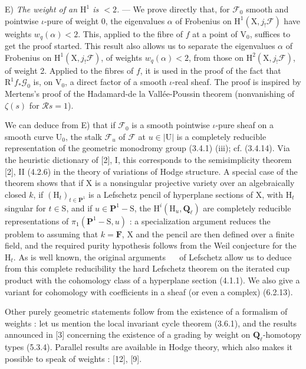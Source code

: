 \documentclass[11pt,leqno]{article}
\newcommand{\Page}[1]{\ifvmode\noindent\else\unskip\ \fi{\footnotesize\textcolor{gray}{[p.\,#1]}}\ \ignorespaces}
\begin{document}
E) \textit{The weight of an \(\mathrm{H}^1\) is \(<2\).} — We prove directly that, for \(\mathscr{F}_0\) smooth and pointwise \(\iota\)-pure of weight 0, the eigenvalues \(\alpha\) of Frobenius on \(\mathrm{H}^1(\mathrm{X},j_!\mathscr{F})\) have weights \(w_q(\alpha)<2\). This, applied to the fibre of \(f\) at a point of \(\mathrm{V}_0\), suffices to get the proof started. This result also allows us to separate the eigenvalues \(\alpha\) of Frobenius on \(\mathrm{H}^1(\mathrm{X},j_!\mathscr{F})\), of weights \(w_q(\alpha)<2\), from those on \(\mathrm{H}^2(\mathrm{X},j_!\mathscr{F})\), of weight 2. Applied to the fibres of \(f\), it is used in the proof of the fact that \(\mathrm{R}^1 f_*\mathscr{G}_0\) is, on \(\mathrm{V}_0\), a direct factor of a smooth \(\iota\)-real sheaf. The proof is inspired by Mertens’s proof of the Hadamard-de la Vallée-Poussin theorem (nonvanishing of \(\zeta(s)\) for \(\mathscr{R}s=1\)).

We can deduce from E) that if \(\mathscr{F}_0\) is a smooth pointwise \(\iota\)-pure sheaf on a smooth curve \(\mathrm{U}_0\), the stalk \(\mathscr{F}_u\) of \(\mathscr{F}\) at \(u\in|\mathrm{U}|\) is a completely reducible representation of the geometric monodromy group (3.4.1) (iii); cf. (3.4.14). Via the heuristic dictionary of [2], I, this corresponds to the semisimplicity theorem [2], II (4.2.6) in the theory of variations of Hodge structure. A special case of the theorem shows that if \(\mathrm{X}\) is a nonsingular projective variety over an algebraically closed \(k\), if \((\mathrm{H}_t)_{t\in\mathbf{P}^1}\) is a Lefschetz pencil of hyperplane sections of \(\mathrm{X}\), with \(\mathrm{H}_t\) singular for \(t\in\mathrm{S}\), and if \(u\in\mathbf{P}^1-\mathrm{S}\), the \(\mathrm{H}^i(\mathrm{H}_u,\mathbf{Q}_\ell)\) are completely reducible representations of \(\pi_1(\mathbf{P}^1-\mathrm{S},u)\) : a specialization argument reduces the problem to assuming that \(k=\mathbf{F}\), \(\mathrm{X}\) and the pencil are then defined over a finite field, and the required purity hypothesis follows from the Weil conjecture for the \(\mathrm{H}_t\). As is well known, the original arguments
\Page{142}
of Lefschetz allow us to deduce from this complete reducibility the hard Lefschetz theorem on the iterated cup product with the cohomology class of a hyperplane section (4.1.1). We also give a variant for cohomology with coefficients in a sheaf (or even a complex) (6.2.13).

Other purely geometric statements follow from the existence of a formalism of weights : let us mention the local invariant cycle theorem (3.6.1), and the results announced in [3] concerning the existence of a grading by weight on \(\mathbf{Q}_\ell\)-homotopy types (5.3.4). Parallel results are available in Hodge theory, which also makes it possible to speak of weights : [12], [9].
\end{document}
